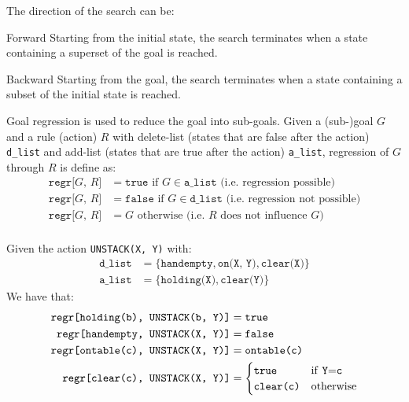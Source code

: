 The direction of the search can be:
\begin{descriptionlist}
    \item[Forward] 
        Starting from the initial state, the search terminates when a state containing a superset of the goal is reached.
    \item[Backward] 
        Starting from the goal, the search terminates when a state containing a subset of the initial state is reached.

        Goal regression is used to reduce the goal into sub-goals.
        Given a (sub-)goal $G$ and a rule (action) $R$ with delete-list (states that are false after the action) \texttt{d\_list}
        and add-list (states that are true after the action) \texttt{a\_list}, regression of $G$ through $R$ is define as:
        \[
            \begin{split}
                \texttt{regr[$G$, $R$]} &= \texttt{true} \text{ if } G \in \texttt{a\_list} \text{ (i.e. regression possible)} \\
                \texttt{regr[$G$, $R$]} &= \texttt{false} \text{ if } G \in \texttt{d\_list} \text{ (i.e. regression not possible)} \\
                \texttt{regr[$G$, $R$]} &= G \text{ otherwise} \text{ (i.e. $R$ does not influence $G$)} \\
            \end{split}  
        \]

        \begin{example}
            Given the action \texttt{UNSTACK(X, Y)} with:
            \[
                \begin{split}
                    \texttt{d\_list} &= \{ \texttt{handempty}, \texttt{on(X, Y)}, \texttt{clear(X)} \} \\
                    \texttt{a\_list} &= \{ \texttt{holding(X)}, \texttt{clear(Y)} \}
                \end{split}
            \]
            We have that:
            \[
                \begin{split}
                    \texttt{regr[holding(b), UNSTACK(b, Y)]} &= \texttt{true} \\
                    \texttt{regr[handempty, UNSTACK(X, Y)]}  &= \texttt{false} \\
                    \texttt{regr[ontable(c), UNSTACK(X, Y)]} &= \texttt{ontable(c)} \\
                    \texttt{regr[clear(c), UNSTACK(X, Y)]} &= \begin{cases}
                        \texttt{true} & \text{if \texttt{Y}=\texttt{c}} \\
                        \texttt{clear(c)} & \text{otherwise}
                    \end{cases}
                \end{split}  
            \]
        \end{example}
\end{descriptionlist}


